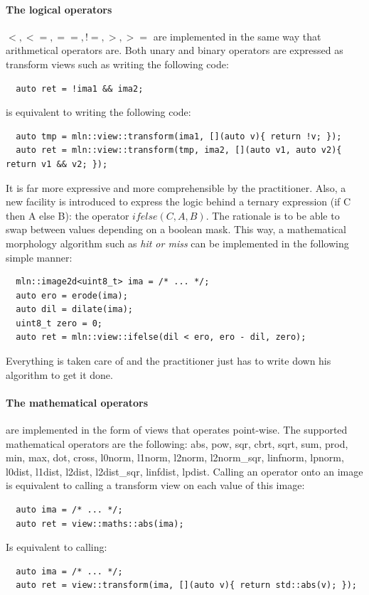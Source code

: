 \paragraph{The logical operators} $<, <=, ==, !=, >, >=$ are implemented in the same way that arithmetical operators
are. Both unary and binary operators are expressed as transform views such as writing the following code:
\begin{verbatim}
  auto ret = !ima1 && ima2;
\end{verbatim}
is equivalent to writing the following code:
\begin{verbatim}
  auto tmp = mln::view::transform(ima1, [](auto v){ return !v; });
  auto ret = mln::view::transform(tmp, ima2, [](auto v1, auto v2){ return v1 && v2; });
\end{verbatim}
It is far more expressive and more comprehensible by the practitioner. Also, a new facility is introduced to express the
logic behind a ternary expression (if C then A else B): the operator $ifelse(C, A, B)$. The rationale is to be able to
swap between values depending on a boolean mask. This way, a mathematical morphology algorithm such as \emph{hit or
  miss} can be implemented in the following simple manner:
\begin{verbatim}
  mln::image2d<uint8_t> ima = /* ... */;
  auto ero = erode(ima);
  auto dil = dilate(ima);
  uint8_t zero = 0;
  auto ret = mln::view::ifelse(dil < ero, ero - dil, zero);
\end{verbatim}
Everything is taken care of and the practitioner just has to write down his algorithm to get it done.

\paragraph{The mathematical operators} are implemented in the form of views that operates point-wise. The supported
mathematical operators are the following: abs, pow, sqr, cbrt, sqrt, sum, prod, min, max, dot, cross, l0norm, l1norm,
l2norm, l2norm\_sqr, linfnorm, lpnorm, l0dist, l1dist, l2dist, l2dist\_sqr, linfdist, lpdist. Calling an operator onto
an image is equivalent to calling a transform view on each value of this image:
\begin{verbatim}
  auto ima = /* ... */;
  auto ret = view::maths::abs(ima);
\end{verbatim}
Is equivalent to calling:
\begin{verbatim}
  auto ima = /* ... */;
  auto ret = view::transform(ima, [](auto v){ return std::abs(v); });
\end{verbatim}


